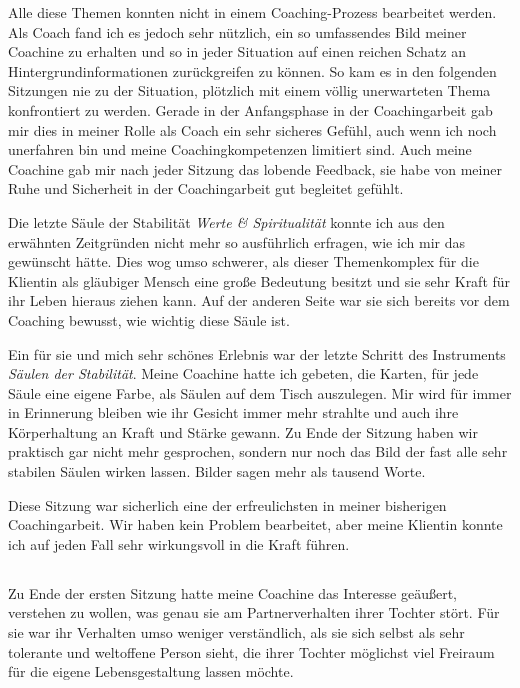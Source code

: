 \documentclass[11pt,a4paper]{article}
\begin{document}
Alle diese Themen konnten nicht in einem Coaching-Prozess bearbeitet werden. Als Coach fand ich es jedoch sehr nützlich, ein so umfassendes Bild meiner Coachine zu erhalten und so in jeder Situation auf einen reichen Schatz an Hintergrundinformationen zurückgreifen zu können. So kam es in den folgenden Sitzungen nie zu der Situation, plötzlich mit einem völlig unerwarteten Thema konfrontiert zu werden. Gerade in der Anfangsphase in der Coachingarbeit gab mir dies in meiner Rolle als Coach ein sehr sicheres Gefühl, auch wenn ich noch unerfahren bin und meine Coachingkompetenzen limitiert sind. Auch meine Coachine gab mir nach jeder Sitzung das lobende Feedback, sie habe von meiner Ruhe und Sicherheit in der Coachingarbeit gut begleitet gefühlt.

Die letzte Säule der Stabilität \textsl{Werte \& Spiritualität} konnte ich aus den erwähnten Zeitgründen nicht mehr so ausführlich erfragen, wie ich mir das gewünscht hätte. Dies wog umso schwerer, als dieser Themenkomplex für die Klientin als gläubiger Mensch eine große Bedeutung besitzt und sie sehr Kraft für ihr Leben hieraus ziehen kann. Auf der anderen Seite war sie sich bereits vor dem Coaching bewusst, wie wichtig diese Säule ist. 

Ein für sie und mich sehr schönes Erlebnis war der letzte Schritt des Instruments \textsl{Säulen der Stabilität}. Meine Coachine hatte ich gebeten, die Karten, für jede Säule eine eigene Farbe, als Säulen auf dem Tisch auszulegen. Mir wird für immer in Erinnerung bleiben wie ihr Gesicht immer mehr strahlte und auch ihre Körperhaltung an Kraft und Stärke gewann. Zu Ende der Sitzung haben wir praktisch gar nicht mehr gesprochen, sondern nur noch das Bild der fast alle sehr stabilen Säulen wirken lassen. Bilder sagen mehr als tausend Worte.

Diese Sitzung war sicherlich eine der erfreulichsten in meiner bisherigen Coachingarbeit. Wir haben kein Problem bearbeitet, aber meine Klientin konnte ich auf jeden Fall sehr wirkungsvoll in die Kraft führen.



\subsection*{\color{Orange}{Zweite Sitzung: Glaubenssätze}}


Zu Ende der ersten Sitzung hatte meine Coachine das Interesse geäußert, verstehen zu wollen, was genau sie am Partnerverhalten ihrer Tochter stört. Für sie war ihr Verhalten umso weniger verständlich, als sie sich selbst als sehr tolerante und weltoffene Person sieht, die ihrer Tochter möglichst viel Freiraum für die eigene Lebensgestaltung lassen möchte.
\end{document}
